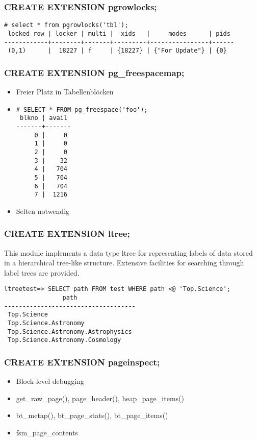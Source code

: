 \documentclass[utf8,hyperref={pdftex,colorlinks,linkcolor=black,citecolor=black,urlcolor=black,filecolor=black,plainpages=false},xcolor=table,hyperref]{beamer}
\begin{document}
\begin{frame}[containsverbatim]
	\frametitle{CREATE EXTENSION pgrowlocks;}
	\small
	\begin{verbatim}
# select * from pgrowlocks('tbl');
 locked_row | locker | multi |  xids   |     modes      | pids 
------------+--------+-------+---------+----------------+------
 (0,1)      |  18227 | f     | {18227} | {"For Update"} | {0}
 \end{verbatim}
\end{frame}

\begin{frame}[containsverbatim]
	\frametitle{CREATE EXTENSION pg_freespacemap;}
	\begin{itemize}
		\item Freier Platz in Tabellenblöcken
		\item
			\begin{verbatim}
# SELECT * FROM pg_freespace('foo');
 blkno | avail 
-------+-------
     0 |     0
     1 |     0
     2 |     0
     3 |    32
     4 |   704
     5 |   704
     6 |   704
     7 |  1216
     \end{verbatim}
     \item Selten notwendig
	     \end{itemize}
\end{frame}


\begin{frame}[containsverbatim]
	\frametitle{CREATE EXTENSION ltree;}
	This module implements a data type ltree for representing labels of data stored in a hierarchical tree-like structure. Extensive facilities for searching through label trees are provided.

	\begin{verbatim}
ltreetest=> SELECT path FROM test WHERE path <@ 'Top.Science';
                path
------------------------------------
 Top.Science
 Top.Science.Astronomy
 Top.Science.Astronomy.Astrophysics
 Top.Science.Astronomy.Cosmology
 \end{verbatim}
\end{frame}

\begin{frame}[containsverbatim]
	\frametitle{CREATE EXTENSION pageinspect;}
	\begin{itemize}
		\item Block-level debugging
		\item get_raw_page(), page_header(), heap_page_items()
		\item bt_metap(), bt_page_stats(), bt_page_items()
		\item fsm_page_contents
	\end{itemize}
\end{frame}
\end{document}
